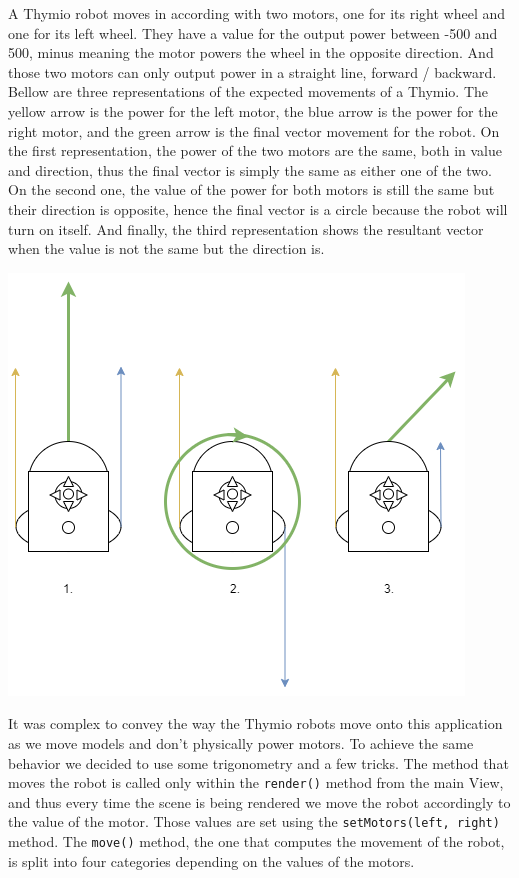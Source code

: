 \documentclass{scrbook}
\begin{document}
A Thymio robot moves in according with two motors, one for its right wheel and one for its left wheel. They have a value for the output power between -500 and 500, minus meaning the motor powers the wheel in the opposite direction. 
And those two motors can only output power in a straight line, forward / backward. Bellow are three representations of the expected movements of a Thymio. The yellow arrow is the power for the left motor, the blue arrow is the power for the right motor, 
and the green arrow is the final vector movement for the robot. On the first representation, the power of the two motors are the same, both in value and direction, thus the final vector is simply the same as either one of the two.
On the second one, the value of the power for both motors is still the same but their direction is opposite, hence the final vector is a circle because the robot will turn on itself.
And finally, the third representation shows the resultant vector when the value is not the same but the direction is.
\begin{center}
  \includegraphics[scale=0.8]{./thymio_move}
\end{center}

It was complex to convey the way the Thymio robots move onto this application as we move models and don't physically power motors. To achieve the same behavior we decided to use some trigonometry and a few tricks.
The method that moves the robot is called only within the \texttt{render()} method from the main View, and thus every time the scene is being rendered we move the robot accordingly to the value of the motor. 
Those values are set using the \texttt{setMotors(left, right)} method. The \texttt{move()} method, the one that computes the movement of the robot, is split into four categories depending on the values of the motors. 
\end{document}
